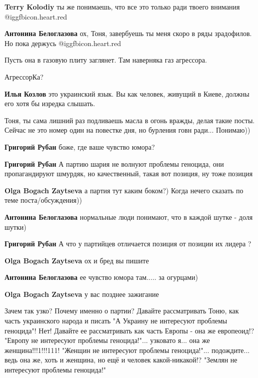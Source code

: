 \begin{multicols}{2}
\begin{itemize}
\textbf{Terry Kolodiy} ты же понимаешь, что все это только ради твоего внимания @igg{fbicon.heart.red}

\textbf{Антонина Белоглазова} ох, Тоня, завербуешь ты меня скоро в ряды зрадофилов. Но пока держусь
@igg{fbicon.heart.red}
\end{itemize} %

Пусть она в газовую плиту заглянет. Там наверняка газ агрессора.

АгрессорКа? 

\begin{itemize} %
\textbf{Илья Козлов} это украинский язык. Вы как человек, живущий в Киеве, должны его хотя бы изредка слышать.
\end{itemize} %


Тоня, ты сама лишний раз подливаешь масла в огонь вражды, делая такие посты.
Сейчас не это номер один на повестке дня, но бурления говн ради... Понимаю))

\begin{itemize} %
\textbf{Григорий Рубан} боже, где ваше чувство юмора?

\textbf{Григорий Рубан} А партию шария не волнуют проблемы геноцида, они пропагандируют шмурдяк, но качественный, такая вот позиция, ну тоже позиция

\textbf{Olga Bogach Zaytseva} а партия тут каким боком?)
Когда нечего сказать по теме поста/обсуждения))

\textbf{Антонина Белоглазова} нормальные люди понимают, что в каждой шутке - доля шутки)

\textbf{Григорий Рубан} А что у партийцев отличается позиция от позиции их лидера ?

\textbf{Olga Bogach Zaytseva} ох и бред вы пишите

\textbf{Антонина Белоглазова} ее чувство юмора там..... за огурцами)

\textbf{Olga Bogach Zaytseva} у вас позднее зажигание


Зачем так узко? Почему именно о партии? Давайте рассматривать Тоню, как часть
украинского народа и писать "А Украину не интересуют проблемы геноцида"! Нет!
Давайте ее рассматривать как часть Европы - она же европеоид!? "Европу не
интересуют проблемы геноцида!"... узковато я... она же женщина!!!1!!!111!
"Женщин не интересуют проблемы геноцида!"... подождите... ведь она же, хоть и
женщина, но ещё и человек какой-никакой!? "Землян не интересуют проблемы
геноцида!"


\end{itemize}
\end{multicols}
